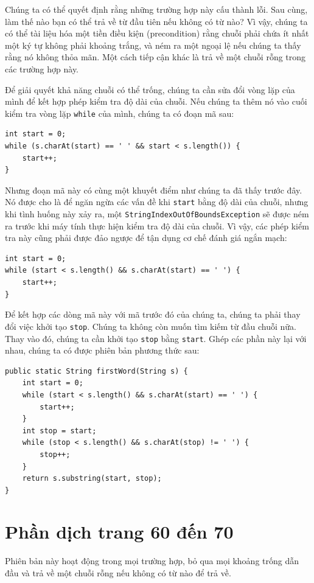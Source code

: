 Chúng ta có thể quyết định rằng những trường hợp này cấu thành lỗi. Sau cùng, làm thế nào bạn có thể trả về từ đầu tiên nếu không có từ nào? Vì vậy, chúng ta có thể tài liệu hóa một tiền điều kiện (precondition) rằng chuỗi phải chứa ít nhất một ký tự không phải khoảng trắng, và ném ra một ngoại lệ nếu chúng ta thấy rằng nó không thỏa mãn. Một cách tiếp cận khác là trả về một chuỗi rỗng trong các trường hợp này.

Để giải quyết khả năng chuỗi có thể trống, chúng ta cần sửa đổi vòng lặp của mình để kết hợp phép kiểm tra độ dài của chuỗi. Nếu chúng ta thêm nó vào cuối kiểm tra vòng lặp \texttt{while} của mình, chúng ta có đoạn mã sau:

\begin{verbatim}
int start = 0;
while (s.charAt(start) == ' ' && start < s.length()) {
    start++;
}
\end{verbatim}

Nhưng đoạn mã này có cùng một khuyết điểm như chúng ta đã thấy trước đây. Nó được cho là để ngăn ngừa các vấn đề khi \texttt{start} bằng độ dài của chuỗi, nhưng khi tình huống này xảy ra, một \texttt{StringIndex\allowbreak{}OutOfBounds\allowbreak{}Exception} sẽ được ném ra trước khi máy tính thực hiện kiểm tra độ dài của chuỗi. Vì vậy, các phép kiểm tra này cũng phải được đảo ngược để tận dụng cơ chế đánh giá ngắn mạch:

\begin{verbatim}
int start = 0;
while (start < s.length() && s.charAt(start) == ' ') {
    start++;
}
\end{verbatim}

Để kết hợp các dòng mã này với mã trước đó của chúng ta, chúng ta phải thay đổi việc khởi tạo \texttt{stop}. Chúng ta không còn muốn tìm kiếm từ đầu chuỗi nữa. Thay vào đó, chúng ta cần khởi tạo \texttt{stop} bằng \texttt{start}. Ghép các phần này lại với nhau, chúng ta có được phiên bản phương thức sau:

\begin{verbatim}
public static String firstWord(String s) {
    int start = 0;
    while (start < s.length() && s.charAt(start) == ' ') {
        start++;
    }
    int stop = start;
    while (stop < s.length() && s.charAt(stop) != ' ') {
        stop++;
    }
    return s.substring(start, stop);
}
\end{verbatim}
\section{Phần dịch trang 60 đến 70}
Phiên bản này hoạt động trong mọi trường hợp, bỏ qua mọi khoảng trống dẫn đầu và trả về một chuỗi rỗng nếu không có từ nào để trả về.

